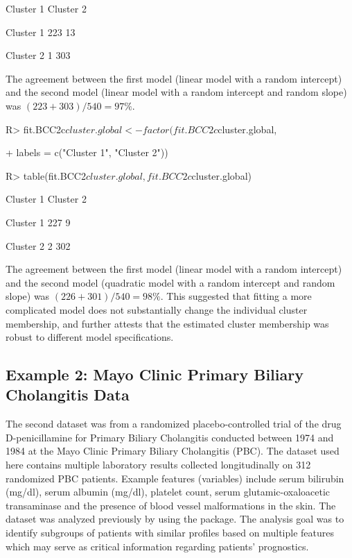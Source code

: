 \begin{example}

           Cluster 1 Cluster 2

  Cluster 1       223        13

  Cluster 2         1       303

\end{example}

The agreement between the first model (linear model with a random intercept) and the second model (linear model
with a random intercept and random slope) was $(223 + 303)/540 = 97\%$. 

\begin{example}

R> fit.BCC2c$cluster.global <- factor(fit.BCC2c$cluster.global,

+        labels = c("Cluster 1", "Cluster 2"))

R> table(fit.BCC2$cluster.global, fit.BCC2c$cluster.global)

\end{example} 

\begin{example}

            Cluster 1 Cluster 2

  Cluster 1       227       9

  Cluster 2         2       302

\end{example}

The agreement between the first model (linear model with a random intercept) and the second model (quadratic model with a random intercept and random slope) was $(226 + 301)/540 = 98\%$. This suggested that fitting a more complicated model does not substantially change the individual cluster membership, and further attests that the estimated cluster membership was robust to different model specifications. 

\subsection{Example 2: Mayo Clinic Primary Biliary Cholangitis Data}

The second dataset was from a randomized placebo-controlled trial of the drug D-penicillamine for Primary Biliary Cholangitis conducted between 1974 and 1984 at the Mayo Clinic Primary Biliary Cholangitis (PBC). The dataset used here contains multiple laboratory results collected longitudinally on 312 randomized PBC patients. Example features (variables) include serum bilirubin (mg/dl), serum albumin (mg/dl), platelet count, serum glutamic-oxaloacetic transaminase and the presence of blood vessel malformations in the skin. The dataset was analyzed previously by \citet{Komarek2013} using the  package. The analysis goal was to identify subgroups of patients with similar profiles based on multiple features which may serve as critical information regarding patients’ prognostics.

